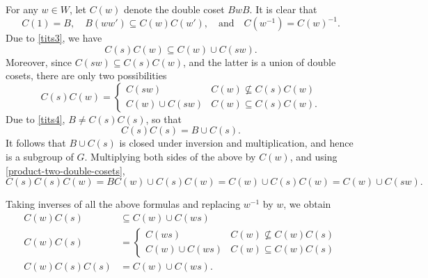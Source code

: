\documentclass{article}
\theoremstyle{thmstyle}
\theoremstyle{defstyle}
\begin{document}
For any $w\in W$, let $C(w)$ denote the double coset $BwB$. It is clear that 
\begin{equation*}
    C(1) = B,\quad B(ww')\subseteq C(w)C(w'),\quad\text{and}\quad C(w^{-1}) = C(w)^{-1}.
\end{equation*}
Due to \ref{tits3}, we have 
\begin{equation*}
    C(s)C(w)\subseteq C(w)\cup C(sw).
\end{equation*}
Moreover, since $C(sw)\subseteq C(s)C(w)$, and the latter is a union of double cosets, there are only two possibilities 
\begin{equation}\label{product-two-double-cosets}
    C(s)C(w) = 
    \begin{cases}
        C(sw) & C(w)\not\subseteq C(s)C(w)\\
        C(w)\cup C(sw) & C(w)\subseteq C(s)C(w).
    \end{cases}
\end{equation}
Due to \ref{tits4}, $B\neq C(s)C(s)$, so that 
\begin{equation*}
    C(s)C(s) = B\cup C(s).
\end{equation*}
It follows that $B\cup C(s)$ is closed under inversion and multiplication, and hence is a subgroup of $G$. Multiplying both sides of the above by $C(w)$, and using \eqref{product-two-double-cosets}, 
\begin{equation}
    C(s)C(s)C(w) = BC(w)\cup C(s)C(w) = C(w)\cup C(s)C(w) = C(w)\cup C(sw).\label{product-three-double-cosets}
\end{equation}

Taking inverses of all the above formulas and replacing $w^{-1}$ by $w$, we obtain  
\begin{align*}
    C(w)C(s) &\subseteq C(w)\cup C(ws)\\
    C(w)C(s) &= 
    \begin{cases}
        C(ws) & C(w)\not\subseteq C(w)C(s)\\
        C(w)\cup C(ws) & C(w)\subseteq C(w)C(s)
    \end{cases}\\
    C(w)C(s)C(s) &= C(w)\cup C(ws).
\end{align*}
\end{document}
